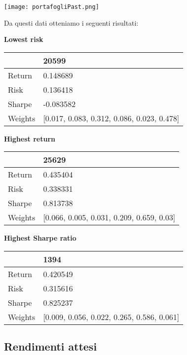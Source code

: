 \documentclass{report}
\begin{document}
\texttt{[image: portafogliPast.png]}

Da questi dati otteniamo i seguenti risultati:

\textbf{Lowest risk}

\begin{tabular}{ll}
\toprule
{} &                                       20599 \\
\midrule
Return  &                                    0.148689 \\
Risk    &                                    0.136418 \\
Sharpe  &                                   -0.083582 \\
Weights &  [0.017, 0.083, 0.312, 0.086, 0.023, 0.478] \\
\bottomrule
\end{tabular}

\textbf{Highest return}

\begin{tabular}{ll}
\toprule
{} &                                      25629 \\
\midrule
Return  &                                   0.435404 \\
Risk    &                                   0.338331 \\
Sharpe  &                                   0.813738 \\
Weights &  [0.066, 0.005, 0.031, 0.209, 0.659, 0.03] \\
\bottomrule
\end{tabular}

\textbf{Highest Sharpe ratio}

\begin{tabular}{ll}
\toprule
{} &                                        1394 \\
\midrule
Return  &                                    0.420549 \\
Risk    &                                    0.315616 \\
Sharpe  &                                    0.825237 \\
Weights &  [0.009, 0.056, 0.022, 0.265, 0.586, 0.061] \\
\bottomrule
\end{tabular}

\subsection{Rendimenti attesi}
\end{document}
